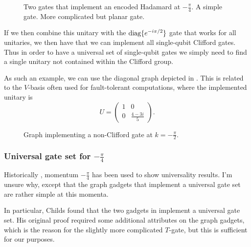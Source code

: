 \documentclass[../thesis-main/thesis-main]{subfiles}
\begin{document}
\begin{figure}
  \centering
  \qquad
  \caption[Hadamard gadget at $\frac{\pi}{2}$]{Two gates that implement an encoded Hadamard at $-\frac{\pi}{4}$.    A simple gate.    More complicated but planar gate.}
   \label{fig:pi_2_universal}
\end{figure}




If we then combine this unitary with the $\operatorname{diag}\{e^{-i\pi/2}\}$ gate that works for all unitaries, we then have that we can implement all single-qubit Clifford gates.  Thus in order to have a universal set of single-qubit gates we simply need to find a single unitary not contained within the Clifford group.


As such an example, we can use the diagonal graph depicted in .  This is related to the $V$-basis often used for fault-tolerant computations, where the implemented unitary is 
\begin{equation}
  U = \begin{pmatrix}
    1 & 0\\
    0 &  \frac{4 - 3 i}{5}
  \end{pmatrix}. 
\end{equation}  

\begin{figure}
  \centering
  
  \caption[Non-clifford gadget at $\frac{\pi}{2}$]{Graph implementing a non-Clifford gate at $k = -\frac{\pi}{2}$.
    \label{fig:pi_2_nonClifford}}
\end{figure}



\subsubsection{Universal gate set for $-\frac{\pi}{4}$}

Historically \cite{Chi09,MPQW}, momentum $-\frac{\pi}{4}$ has been used to show universality results.  I'm unsure why, except that the graph gadgets that implement a universal gate set are rather simple at this momenta.  

In particular, Childs found that the two gadgets in  implement a universal gate set.  His original proof required some additional attributes on the graph gadgets, which is the reason for the slightly more complicated $T$-gate, but this is sufficient for our purposes.
\end{document}

